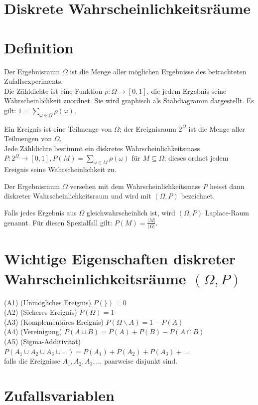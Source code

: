 \documentclass[10pt]{article}
\begin{document}
\section*{Diskrete Wahrscheinlichkeitsräume}
\section*{Definition}
Der Ergebnisraum $\Omega$ ist die Menge aller möglichen Ergebnisse des betrachteten Zufallsexperiments.\\
Die Zähldichte ist eine Funktion $\rho: \Omega \rightarrow[0,1]$, die jedem Ergebnis seine Wahrscheinlichkeit zuordnet. Sie wird graphisch als Stabdiagramm dargestellt. Es gilt: $1=\sum_{\omega \in \Omega} \rho(\omega)$.

Ein Ereignis ist eine Teilmenge von $\Omega$; der Ereignisraum $2^{\Omega}$ ist die Menge aller Teilmengen von $\Omega$.\\
Jede Zähldichte bestimmt ein diskretes Wahrscheinlichkeitsmass $P: 2^{\Omega} \rightarrow[0,1], P(M)=\sum_{\omega \in M} \rho(\omega)$ für $M \subseteq \Omega$; dieses ordnet jedem Ereignis seine Wahrscheinlichkeit zu.

Der Ergebnisraum $\Omega$ versehen mit dem Wahrscheinlichkeitsmass $P$ heisst dann diskreter Wahrscheinlichkeitsraum und wird mit $(\Omega, P)$ bezeichnet.

Falls jedes Ergebnis aus $\Omega$ gleichwahrscheinlich ist, wird $(\Omega, P)$ Laplace-Raum genannt. Für diesen Spezialfall gilt: $P(M)=\frac{|M|}{|\Omega|}$.

\section*{Wichtige Eigenschaften diskreter Wahrscheinlichkeitsräume $(\Omega, P)$}
(A1) (Unmögliches Ereignis) $P(\})=0$\\
(A2) (Sicheres Ereignis) $P(\Omega)=1$\\
(A3) (Komplementäres Ereignis) $P(\Omega \backslash A)=1-P(A)$\\
(A4) (Vereinigung) $P(A \cup B)=P(A)+P(B)-P(A \cap B)$\\
(A5) (Sigma-Additivität) $P\left(A_{1} \cup A_{2} \cup A_{3} \cup \ldots\right)=P\left(A_{1}\right)+P\left(A_{2}\right)+P\left(A_{3}\right)+\ldots$\\
falls die Ereignisse $A_{1}, A_{2}, A_{3}, \ldots$ paarweise disjunkt sind.

\section*{Zufallsvariablen}
\end{document}
